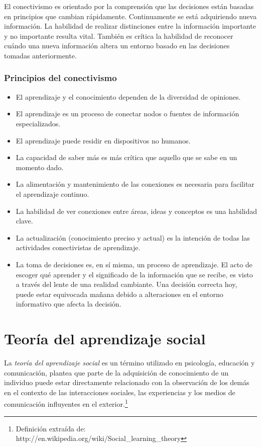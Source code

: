 El conectivismo es orientado por la comprensión que las decisiones están basadas
en principios que cambian rápidamente. Continuamente se está adquiriendo nueva
información. La habilidad de realizar distinciones entre la información
importante y no importante resulta vital. También es crítica la habilidad de
reconocer cuándo una nueva información altera un entorno basado en las
decisiones tomadas anteriormente.

\subsubsection{Principios del conectivismo}

\begin{itemize}
\item El aprendizaje y el conocimiento dependen de la diversidad de opiniones.
\item El aprendizaje es un proceso de conectar nodos o fuentes de información
especializados.
\item El aprendizaje puede residir en dispositivos no humanos.
\item La capacidad de saber más es más crítica que aquello que se sabe en un
momento dado.
\item La alimentación y mantenimiento de las conexiones es necesaria para
facilitar el aprendizaje continuo.
\item La habilidad de ver conexiones entre áreas, ideas y conceptos es una
habilidad clave.
\item La actualización (conocimiento preciso y actual) es la intención de todas
las actividades conectivistas de aprendizaje.
\item La toma de decisiones es, en sí misma, un proceso de aprendizaje. El acto
de escoger qué aprender y el significado de la información que se recibe, es
visto a través del lente de una realidad cambiante. Una decisión correcta hoy,
puede estar equivocada mañana debido a alteraciones en el entorno informativo
que afecta la decisión. 
\end{itemize}

\section{Teoría del aprendizaje social}

La \emph{teoría del aprendizaje social} es un término utilizado en psicología,
educación y comunicación, plantea que parte de la adquisición de conocimiento
de un individuo puede estar directamente relacionado con la observación de los
demás en el contexto de las interacciones sociales, las experiencias y los
medios de comunicación influyentes en el exterior.\footnote{Definición extraída
de: http://en.wikipedia.org/wiki/Social\_learning\_theory}

